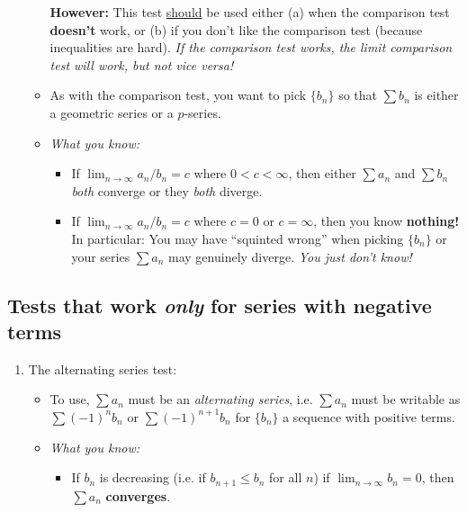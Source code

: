 \documentclass[12pt]{article}
\newcommand{\shortlim}{\lim_{n\to\infty}}
\begin{document}
\begin{enumerate}
\begin{itemize}
			\textbf{However:} This test \ul{should} be used either (a) when the comparison test \textbf{doesn't} work, or (b) if you don't like the comparison test (because inequalities are hard). \textit{If the comparison test works, the limit comparison test will work, but not vice versa!}
			\item As with the comparison test, you want to pick $\{b_n\}$ so that $\sum b_n$ is either a geometric series or a $p$-series.
			\item \textit{What you know:} 
			\begin{itemize}
				\item If $\shortlim a_n/b_n=c$ where $0<c<\infty$, then either $\sum a_n$ and $\sum b_n$ \textit{both} converge or they \textit{both} diverge.
				\item If $\shortlim a_n/b_n=c$ where $c=0$ or $c=\infty$, then you know \textbf{nothing!} In particular: You may have ``squinted wrong'' when picking $\{b_n\}$ or your series $\sum a_n$ may genuinely diverge. \textit{You just don't know!}
			\end{itemize}
		\end{itemize} 
	\end{enumerate}

	\subsection*{Tests that work \textit{only} for series with negative terms}
	\begin{enumerate}
		\item[] \hspace{-0.25in}The alternating series test:
		\begin{itemize}
			\item To use, $\sum a_n$ must be an \textit{alternating series}, i.e. $\sum a_n$ must be writable as $\sum (-1)^nb_n$ or $\sum (-1)^{n+1}b_n$ for $\{b_n\}$ a sequence with positive terms.
			\item \textit{What you know:} 
			\begin{itemize}
				\item If $b_n$ is decreasing (i.e. if $b_{n+1}\leq b_n$ for all $n$) if $\shortlim b_n=0$, then $\sum a_n$ \textbf{converges}.
			\end{itemize}
		\end{itemize}
	\end{enumerate}
\end{document}
